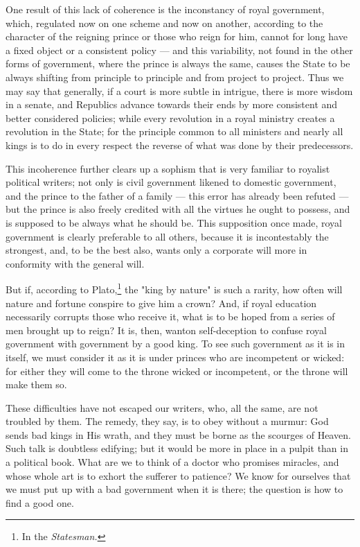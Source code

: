 \documentclass[12pt]{report}
\begin{document}
One result of this lack of coherence is the inconstancy of royal government, which, regulated now on one scheme and now on another, according to the character of the reigning prince or those who reign for him, cannot for long have a fixed object or a consistent policy — and this variability, not found in the other forms of government, where the prince is always the same, causes the State to be always shifting from principle to principle and from project to project. Thus we may say that generally, if a court is more subtle in intrigue, there is more wisdom in a senate, and Republics advance towards their ends by more consistent and better considered policies; while every revolution in a royal ministry creates a revolution in the State; for the principle common to all ministers and nearly all kings is to do in every respect the reverse of what was done by their predecessors.

This incoherence further clears up a sophism that is very familiar to royalist political writers; not only is civil government likened to domestic government, and the prince to the father of a family — this error has already been refuted — but the prince is also freely credited with all the virtues he ought to possess, and is supposed to be always what he should be. This supposition once made, royal government is clearly preferable to all others, because it is incontestably the strongest, and, to be the best also, wants only a corporate will more in conformity with the general will.

But if, according to Plato,\footnote{In the \textit{Statesman.}} the "king by nature" is such a rarity, how often will nature and fortune conspire to give him a crown? And, if royal education necessarily corrupts those who receive it, what is to be hoped from a series of men brought up to reign? It is, then, wanton self-deception to confuse royal government with government by a good king. To see such government as it is in itself, we must consider it as it is under princes who are incompetent or wicked: for either they will come to the throne wicked or incompetent, or the throne will make them so.

These difficulties have not escaped our writers, who, all the same, are not troubled by them. The remedy, they say, is to obey without a murmur: God sends bad kings in His wrath, and they must be borne as the scourges of Heaven. Such talk is doubtless edifying; but it would be more in place in a pulpit than in a political book. What are we to think of a doctor who promises miracles, and whose whole art is to exhort the sufferer to patience? We know for ourselves that we must put up with a bad government when it is there; the question is how to find a good one.
\end{document}
